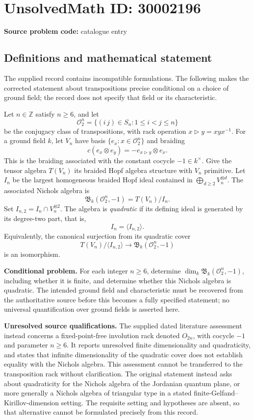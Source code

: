 \documentclass[11pt]{article}
\newcommand{\Z}{\mathbb{Z}}
\begin{document}
\section*{UnsolvedMath ID: 30002196}
\textbf{Source problem code:} catalogue entry
\subsection{Definitions and mathematical statement}
The supplied record contains incompatible formulations. The following makes the corrected statement about transpositions precise conditional on a choice of ground field; the record does not specify that field or its characteristic.

Let \(n\in\Z\) satisfy \(n\geq6\), and let
\[
\mathcal O_2^n=\{(i\,j)\in S_n:1\leq i<j\leq n\}
\]
be the conjugacy class of transpositions, with rack operation \(x\triangleright y=xyx^{-1}\). For a ground field \(k\), let \(V_n\) have basis \(\{e_x:x\in\mathcal O_2^n\}\) and braiding
\[
c(e_x\otimes e_y)=-e_{x\triangleright y}\otimes e_x.
\]
This is the braiding associated with the constant cocycle \(-1\in k^\times\). Give the tensor algebra \(T(V_n)\) its braided Hopf algebra structure with \(V_n\) primitive. Let \(I_n\) be the largest homogeneous braided Hopf ideal contained in \(\bigoplus_{d\geq2}V_n^{\otimes d}\). The associated Nichols algebra is
\[
\mathfrak B_k(\mathcal O_2^n,-1)=T(V_n)/I_n.
\]
Set \(I_{n,2}=I_n\cap V_n^{\otimes2}\). The algebra is \emph{quadratic} if its defining ideal is generated by its degree-two part, that is,
\[
I_n=\langle I_{n,2}\rangle.
\]
Equivalently, the canonical surjection from its quadratic cover
\[
T(V_n)/\langle I_{n,2}\rangle\longrightarrow\mathfrak B_k(\mathcal O_2^n,-1)
\]
is an isomorphism.

\textbf{Conditional problem.} For each integer \(n\geq6\), determine \(\dim_k\mathfrak B_k(\mathcal O_2^n,-1)\), including whether it is finite, and determine whether this Nichols algebra is quadratic. The intended ground field and characteristic must be recovered from the authoritative source before this becomes a fully specified statement; no universal quantification over ground fields is asserted here.

\textbf{Unresolved source qualifications.} The supplied dated literature assessment instead concerns a fixed-point-free involution rack denoted \(O_{2n}\), with cocycle \(-1\) and parameter \(n\geq6\). It reports unresolved finite dimensionality and quadraticity, and states that infinite dimensionality of the quadratic cover does not establish equality with the Nichols algebra. This assessment cannot be transferred to the transposition rack without clarification. The original statement instead asks about quadraticity for the Nichols algebra of the Jordanian quantum plane, or more generally a Nichols algebra of triangular type in a stated finite-Gelfand--Kirillov-dimension setting. The requisite setting and hypotheses are absent, so that alternative cannot be formulated precisely from this record.
\end{document}
